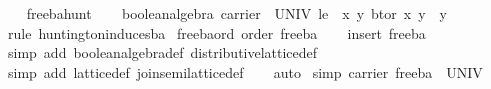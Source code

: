 \begin{isabellebody}
\ \ \isamarkupfalse%
\ free{}ba{}hunt\isanewline
\ \ \isamarkupfalse%
\ {}boolean{}algebra\ {}carrier\ {}\ UNIV{}\ le\ {}\ {}x\ y{}\ bt{}or\ x\ y\ {}\ y{}{}\isanewline
\ \ \ \ \isamarkupfalse%
\ {}rule\ huntington{}induces{}ba{}\isanewline
{}\isamarkupfalse%
%
\endisatagproof
{\isafoldproof}%
%
\isadelimproof
\isanewline
%
\endisadelimproof
\isanewline
{}\isamarkupfalse%
\ free{}ba{}ord{}\ {}order\ free{}ba{}\isanewline
%
\isadelimproof
\ \ %
\endisadelimproof
%
\isatagproof
{}\isamarkupfalse%
\ {}insert\ free{}ba{}\isanewline
\ \ \isamarkupfalse%
\ {}simp\ add{}\ boolean{}algebra{}def\ distributive{}lattice{}def{}\isanewline
\ \ \isamarkupfalse%
\ {}simp\ add{}\ lattice{}def\ join{}semilattice{}def{}\isanewline
\ \ \isamarkupfalse%
\ auto%
\endisatagproof
{\isafoldproof}%
%
\isadelimproof
\isanewline
%
\endisadelimproof
\isanewline
{}\isamarkupfalse%
\ {}simp{}{}\ {}carrier\ free{}ba\ {}\ UNIV{}\isanewline

\end{isabellebody}
